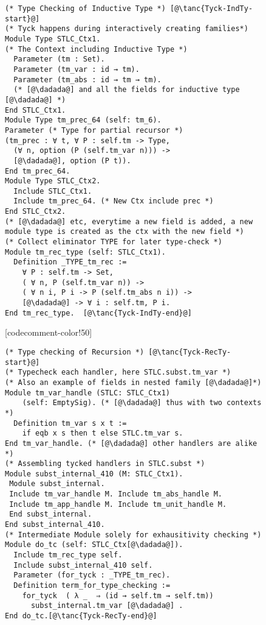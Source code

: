 \begin{figure}

\begin{minipage}{\textwidth}
\begin{multicols}{2}




\begin{lstlisting}
(* Type Checking of Inductive Type *) [@\tanc{Tyck-IndTy-start}@]
(* Tyck happens during interactively creating families*)
Module Type STLC_Ctx1. 
(* The Context including Inductive Type *)
  Parameter (tm : Set).
  Parameter (tm_var : id → tm).
  Parameter (tm_abs : id → tm → tm).
  (* [@\dadada@] and all the fields for inductive type [@\dadada@] *)
End STLC_Ctx1.
Module Type tm_prec_64 (self: tm_6). 
Parameter (* Type for partial recursor *)
(tm_prec : ∀ t, ∀ P : self.tm -> Type,
  (∀ n, option (P (self.tm_var n))) -> 
  [@\dadada@], option (P t)).
End tm_prec_64.
Module Type STLC_Ctx2.  
  Include STLC_Ctx1.
  Include tm_prec_64. (* New Ctx include prec *)
End STLC_Ctx2.
(* [@\dadada@] etc, everytime a new field is added, a new 
module type is created as the ctx with the new field *)
(* Collect eliminator TYPE for later type-check *)
Module tm_rec_type (self: STLC_Ctx1).
  Definition _TYPE_tm_rec :=
    ∀ P : self.tm -> Set,
    ( ∀ n, P (self.tm_var n)) ->
    ( ∀ n i, P i -> P (self.tm_abs n i)) ->
    [@\dadada@] -> ∀ i : self.tm, P i.
End tm_rec_type.  [@\tanc{Tyck-IndTy-end}@]
\end{lstlisting}

[codecomment-color!50]



\begin{lstlisting}
(* Type checking of Recursion *) [@\tanc{Tyck-RecTy-start}@]
(* Typecheck each handler, here STLC.subst.tm_var *)
(* Also an example of fields in nested family [@\dadada@]*) 
Module tm_var_handle (STLC: STLC_Ctx1)
    (self: EmptySig). (* [@\dadada@] thus with two contexts *) 
  Definition tm_var s x t := 
    if eqb x s then t else STLC.tm_var s.
End tm_var_handle. (* [@\dadada@] other handlers are alike *)
(* Assembling tycked handlers in STLC.subst *)
Module subst_internal_410 (M: STLC_Ctx1). 
 Module subst_internal.
 Include tm_var_handle M. Include tm_abs_handle M.
 Include tm_app_handle M. Include tm_unit_handle M.
 End subst_internal.
End subst_internal_410.
(* Intermediate Module solely for exhausitivity checking *) 
Module do_tc (self: STLC_Ctx[@\dadada@]).
  Include tm_rec_type self. 
  Include subst_internal_410 self.
  Parameter (for_tyck : _TYPE_tm_rec).
  Definition term_for_type_checking :=
    for_tyck  ( λ _  ⇒ (id → self.tm → self.tm))
      subst_internal.tm_var [@\dadada@] .
End do_tc.[@\tanc{Tyck-RecTy-end}@]
\end{lstlisting}


\end{multicols}
\end{minipage}
\end{figure}
